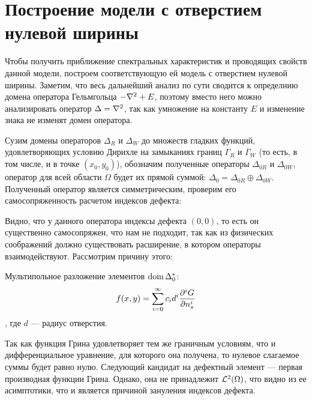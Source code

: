 \section{Построение модели с отверстием нулевой ширины}
Чтобы получить приближение спектральных характеристик и проводящих свойств данной модели, построем соответствующую ей модель с отверстием нулевой ширины. Заметим, что весь дальнейший анализ по сути сводится к определнию домена оператора Гельмгольца $-\laplacian + E$, поэтому вместо него можно анализировать оператор $\Delta = \laplacian$, так как умножение на константу $E$ и изменение знака не изменят домен оператора.

Сузим домены операторов $\Delta_R$ и $\Delta_W$ до множеств гладких функций, удовлетворяющих условию Дирихле на замыканиях границ $\Gamma_R$ и $\Gamma_W$ (то есть, в том числе, и в точке $(x_0, y_0)$), обозначим полученные операторы $\Delta_{0R}$ и $\Delta_{0W}$, оператор для всей области $\Omega$ будет их прямой суммой: $\Delta_0 = \Delta_{0R} \oplus \Delta_{0W}$. Полученный оператор является симметрическим, проверим его самосопряженность расчетом индексов дефекта:


Видно, что у данного оператора индексы дефекта $(0, 0)$, то есть он существенно самосопряжен, что нам не подходит, так как из физических соображений должно существовать расширение, в котором операторы взаимодействуют. Рассмотрим причину этого:


Мультипольное разложение элементов $\operatorname{dom} \Delta_0^*$:
\[
f(x, y) = \sum\limits_{i = 0}^\infty c_i d^i \pdv[i]{G}{n_s} (x, y, x_0, y_0; E_0)
\]
, где $d$ — радиус отверстия.

Так как функция Грина удовлетворяет тем же граничным условиям, что и дифференциальное уравнение, для которого она получена, то нулевое слагаемое суммы будет равно нулю. Следующий кандидат на дефектный элемент — первая производная функции Грина. Однако, она не принадлежит $\mathcal{L}^2(\Omega)$, что видно из ее асимптотики, что и является причиной зануления индексов дефекта.

